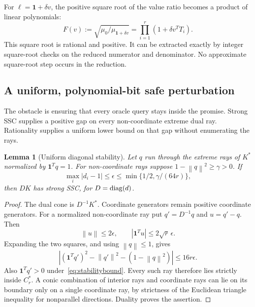 \documentclass[11pt]{article}
\newtheorem{lemma}[theorem]{Lemma}
\theoremstyle{definition}\newtheorem{definition}[theorem]{Definition}
\newcommand{\e}{\mathbf1}\newcommand{\cone}{\operatorname{cone}}
\newcommand{\norm}[1]{\left\lVert#1\right\rVert}\newcommand{\Tr}{\mathcal T}
\begin{document}
For $\ell=\e+\delta v$, the positive square root of the value ratio becomes a product of linear polynomials:
\begin{equation}
 F(v):=\sqrt{\mu_0/\mu_{\e+\delta v}}
       =\prod_{i=1}^r(1+\delta v^TT_i).
 \label{eq:F}
\end{equation}
This square root is rational and positive. It can be extracted exactly by integer square-root checks on the reduced numerator and denominator. No approximate square-root step occurs in the reduction.

\subsection{A uniform, polynomial-bit safe perturbation}
The obstacle is ensuring that every oracle query stays inside the promise. Strong SSC supplies a positive gap on every non-coordinate extreme dual ray. Rationality supplies a uniform lower bound on that gap without enumerating the rays.

\begin{lemma}[Uniform diagonal stability]
\label{lem:stability}
Let $q$ run through the extreme rays of $K^*$ normalized by $\e^Tq=1$. For non-coordinate rays suppose $1-\norm{q}^2\ge\gamma>0$. If
\begin{equation}
 \max_i|d_i-1|\le\epsilon\le\min\{1/2,\gamma/(64r)\},
 \label{eq:stabilitybound}
\end{equation}
then $DK$ has strong SSC, for $D=\operatorname{diag}(d)$.
\end{lemma}
\begin{proof}
The dual cone is $D^{-1}K^*$. Coordinate generators remain positive coordinate generators. For a normalized non-coordinate ray put $q'=D^{-1}q$ and $u=q'-q$. Then
\[
 \norm{u}\le2\epsilon,\qquad |\e^Tu|\le2\sqrt r\,\epsilon.
\]
Expanding the two squares, and using $\norm{q}\le1$, gives
\begin{equation}
 \left|(\e^Tq')^2-\norm{q'}^2-(1-\norm{q}^2)\right|\le16r\epsilon.
\end{equation}
Also $\e^Tq'>0$ under~\eqref{eq:stabilitybound}. Every such ray therefore lies strictly inside $C_r^*$. A conic combination of interior rays and coordinate rays can lie on its boundary only on a single coordinate ray, by strictness of the Euclidean triangle inequality for nonparallel directions. Duality proves the assertion.
\end{proof}
\end{document}
